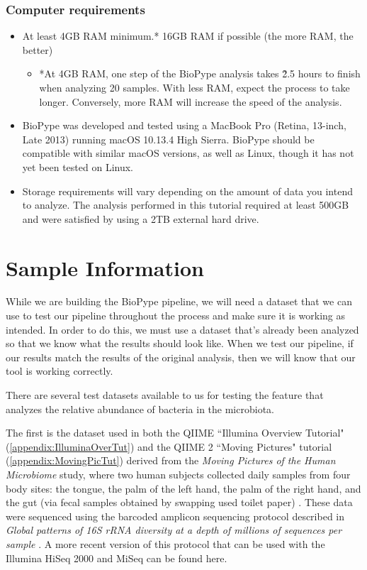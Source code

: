 \subsection*{Computer requirements}
\begin{itemize}
    \item At least 4GB RAM minimum.* 16GB RAM if possible (the more RAM, the better)
    \begin{itemize}
    \item *At 4GB RAM, one step of the BioPype analysis takes \~2.5 hours to finish when analyzing 20 samples. With less RAM, expect the process to take longer. Conversely, more RAM will increase the speed of the analysis. 
    \end{itemize}
    \item BioPype was developed and tested using a MacBook Pro (Retina, 13-inch, Late 2013) running macOS 10.13.4 High Sierra. BioPype should be compatible with similar macOS versions, as well as Linux, though it has not yet been tested on Linux.
    \item Storage requirements will vary depending on the amount of data you intend to analyze. The analysis performed in this tutorial required at least 500GB and were satisfied by using a 2TB external hard drive.
\end{itemize}


%
\chapter{Sample Information}

While we are building the BioPype pipeline, we will need a dataset that we can use to test our pipeline throughout the process and make sure it is working as intended. In order to do this, we must use a dataset that's already been analyzed so that we know what the results should look like. When we test our pipeline, if our results match the results of the original analysis, then we will know that our tool is working correctly.

There are several test datasets available to us for testing the feature that analyzes the relative abundance of bacteria in the microbiota.

The first is the dataset used in both the QIIME ``Illumina Overview Tutorial" (\ref{appendix:IlluminaOverTut})  and the QIIME 2 ``Moving Pictures" tutorial (\ref{appendix:MovingPicTut}) derived from the \textit{Moving Pictures of the Human Microbiome} study, where two human subjects collected daily samples from four body sites: the tongue, the palm of the left hand, the palm of the right hand, and the gut (via fecal samples obtained by swapping used toilet paper) \cite{Caporaso2011}. These data were sequenced using the barcoded amplicon sequencing protocol described in \textit{Global patterns of 16S rRNA diversity at a depth of millions of sequences per sample} \cite{Caporaso2011a}. A more recent version of this protocol that can be used with the Illumina HiSeq 2000 and MiSeq can be found here.


